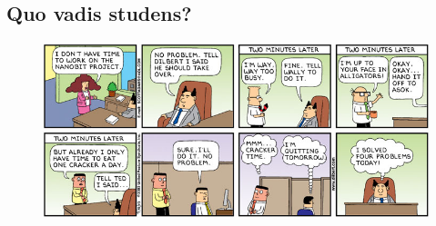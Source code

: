 \subsection{Quo vadis studens?}

\begin{figure}[b]
  \includegraphics[width=\textwidth ]{bilder/comics/dilbert.png}
\end{figure}

